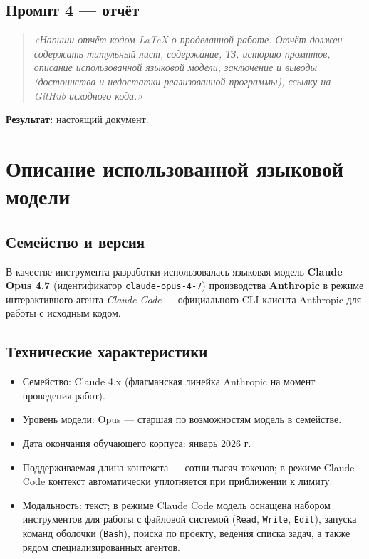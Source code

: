 \documentclass[a4paper, final]{article}
\begin{document}
\subsection{Промпт 4 --- отчёт}

\begin{quote}
\itshape
«Напиши отчёт кодом LaTeX о проделанной работе. Отчёт должен содержать
титульный лист, содержание, ТЗ, историю промптов, описание использованной
языковой модели, заключение и выводы (достоинства и недостатки
реализованной программы), ссылку на GitHub исходного кода.»
\end{quote}

\textbf{Результат:} настоящий документ.

\newpage

\section{Описание использованной языковой модели}

\subsection{Семейство и версия}

В качестве инструмента разработки использовалась языковая модель
\textbf{Claude Opus 4.7} (идентификатор \texttt{claude-opus-4-7})
производства \textbf{Anthropic} в режиме интерактивного агента
\textit{Claude Code} --- официального CLI-клиента Anthropic для
работы с исходным кодом.

\subsection{Технические характеристики}

\begin{itemize}
    \item Семейство: Claude 4.x (флагманская линейка Anthropic
          на момент проведения работ).
    \item Уровень модели: Opus --- старшая по возможностям модель в семействе.
    \item Дата окончания обучающего корпуса: январь 2026 г.
    \item Поддерживаемая длина контекста --- сотни тысяч токенов;
          в режиме Claude Code контекст автоматически уплотняется
          при приближении к лимиту.
    \item Модальность: текст; в режиме Claude Code модель оснащена
          набором инструментов для работы с файловой системой
          (\texttt{Read}, \texttt{Write}, \texttt{Edit}), запуска
          команд оболочки (\texttt{Bash}), поиска по проекту,
          ведения списка задач, а также рядом специализированных агентов.
\end{itemize}
\end{document}
